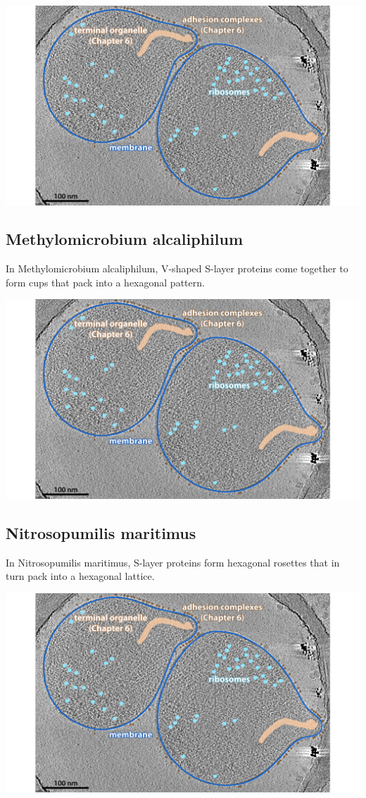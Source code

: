 \documentclass[]{tufte-book}
\begin{document}
\includegraphics{img/02_static/2_1_Mgenitalium}

\hypertarget{M._alcaliphilum}{\subsection{Methylomicrobium
alcaliphilum}\label{M._alcaliphilum}}

In Methylomicrobium alcaliphilum, V-shaped S-layer proteins come
together to form cups that pack into a hexagonal pattern.

\includegraphics{img/02_static/2_1_Mgenitalium}

\hypertarget{N._maritimus}{\subsection{Nitrosopumilis
maritimus}\label{N._maritimus}}

In Nitrosopumilis maritimus, S-layer proteins form hexagonal rosettes
that in turn pack into a hexagonal lattice.

\includegraphics{img/02_static/2_1_Mgenitalium}
\end{document}
